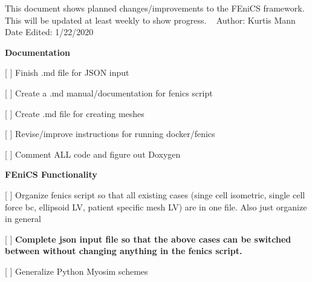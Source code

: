 This document shows planned changes/improvements to the F\+Eni\+CS framework. This will be updated at least weekly to show progress. ~\newline
 Author\+: Kurtis Mann ~\newline
 Date Edited\+: 1/22/2020 ~\newline


{\bfseries{Documentation}}
\begin{DoxyItemize}
\item \mbox{[} \mbox{]} Finish .md file for J\+S\+ON input
\item \mbox{[} \mbox{]} Create a .md manual/documentation for fenics script
\item \mbox{[} \mbox{]} Create .md file for creating meshes
\item \mbox{[} \mbox{]} Revise/improve instructions for running docker/fenics
\item \mbox{[} \mbox{]} Comment A\+LL code and figure out Doxygen ~\newline

\end{DoxyItemize}

{\bfseries{F\+Eni\+CS Functionality}} ~\newline

\begin{DoxyItemize}
\item \mbox{[} \mbox{]} Organize fenics script so that all existing cases (singe cell isometric, single cell force bc, ellipsoid LV, patient specific mesh LV) are in one file. Also just organize in general
\item \mbox{[} \mbox{]} {\bfseries{Complete json input file so that the above cases can be switched between without changing anything in the fenics script.}} ~\newline

\item \mbox{[} \mbox{]} Generalize Python Myosim schemes ~\newline

\end{DoxyItemize}

